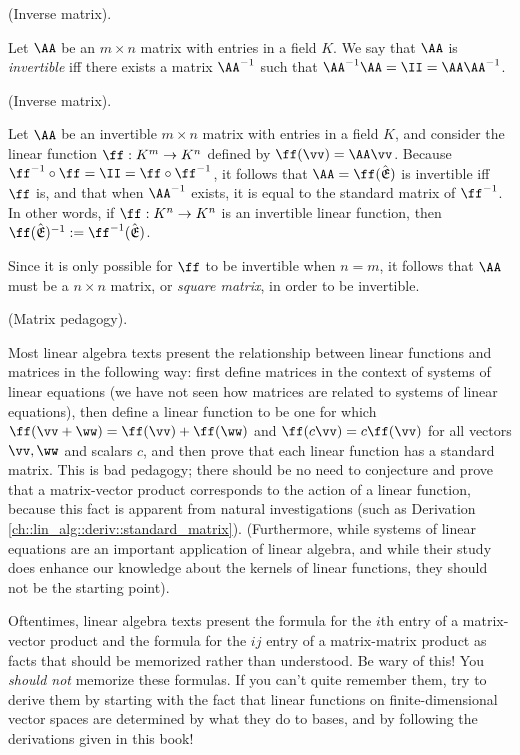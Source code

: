 \begin{defn}
    (Inverse matrix).
    
    Let $\AA$ be an $m \times n$ matrix with entries in a field $K$. We say that $\AA$ is \textit{invertible} iff there exists a matrix $\AA^{-1}$ such that $\AA^{-1} \AA = \II = \AA \AA^{-1}$.
\end{defn}

\begin{theorem}
    (Inverse matrix).

    Let $\AA$ be an invertible $m \times n$ matrix with entries in a field $K$, and consider the linear function $\ff:K^m \rightarrow K^n$ defined by $\ff(\vv) = \AA \vv$. Because $\ff^{-1} \circ \ff = \II = \ff \circ \ff^{-1}$, it follows that $\AA = \ff(\sE)$ is invertible iff $\ff$ is, and that when $\AA^{-1}$ exists, it is equal to the standard matrix of $\ff^{-1}$. In other words, if $\ff:K^n \rightarrow K^n$ is an invertible linear function, then $\ff(\sE)^{-1} := \ff^{-1}(\sE)$.
    
    Since it is only possible for $\ff$ to be invertible when $n = m$, it follows that $\AA$ must be a $n \times n$ matrix, or \textit{square matrix}, in order to be invertible.
\end{theorem}

\begin{remark}
    (Matrix pedagogy). 
    
    Most linear algebra texts present the relationship between linear functions and matrices in the following way: first define matrices in the context of systems of linear equations (we have not seen how matrices are related to systems of linear equations), then define a linear function to be one for which $\ff(\vv + \ww) = \ff(\vv) + \ff(\ww)$ and $\ff(c\vv) = c\ff(\vv)$ for all vectors $\vv, \ww$ and scalars $c$, and then prove that each linear function has a standard matrix. This is bad pedagogy; there should be no need to conjecture and prove that a matrix-vector product corresponds to the action of a linear function, because this fact is apparent from natural investigations (such as Derivation \ref{ch::lin_alg::deriv::standard_matrix}). (Furthermore, while systems of linear equations are an important application of linear algebra, and while their study does enhance our knowledge about the kernels of linear functions, they should not be the starting point).
    
    Oftentimes, linear algebra texts present the formula for the $i$th entry of a matrix-vector product and the formula for the $ij$ entry of a matrix-matrix product as facts that should be memorized rather than understood. Be wary of this! You \textit{should not} memorize these formulas. If you can't quite remember them, try to derive them by starting with the fact that linear functions on finite-dimensional vector spaces are determined by what they do to bases, and by following the derivations given in this book!
\end{remark}

